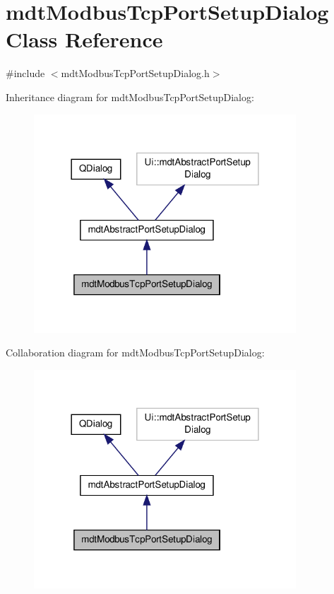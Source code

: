 \hypertarget{classmdt_modbus_tcp_port_setup_dialog}{\section{mdt\-Modbus\-Tcp\-Port\-Setup\-Dialog Class Reference}
\label{classmdt_modbus_tcp_port_setup_dialog}
}


{\ttfamily \#include $<$mdt\-Modbus\-Tcp\-Port\-Setup\-Dialog.\-h$>$}



Inheritance diagram for mdt\-Modbus\-Tcp\-Port\-Setup\-Dialog\-:\nopagebreak
\begin{figure}[H]
\begin{center}
\leavevmode
\includegraphics[width=278pt]{classmdt_modbus_tcp_port_setup_dialog__inherit__graph}
\end{center}
\end{figure}


Collaboration diagram for mdt\-Modbus\-Tcp\-Port\-Setup\-Dialog\-:\nopagebreak
\begin{figure}[H]
\begin{center}
\leavevmode
\includegraphics[width=278pt]{classmdt_modbus_tcp_port_setup_dialog__coll__graph}
\end{center}
\end{figure}
